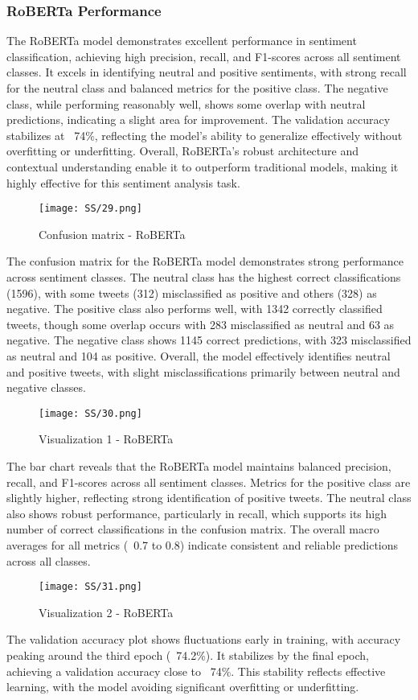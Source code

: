 \documentclass[journal]{IEEEtran}
\begin{document}
\subsubsection*{\textbf{RoBERTa Performance}}
The RoBERTa model demonstrates excellent performance in sentiment classification, achieving high precision, recall, and F1-scores across all sentiment classes. It excels in identifying neutral and positive sentiments, with strong recall for the neutral class and balanced metrics for the positive class. The negative class, while performing reasonably well, shows some overlap with neutral predictions, indicating a slight area for improvement. The validation accuracy stabilizes at ~74\%, reflecting the model's ability to generalize effectively without overfitting or underfitting. Overall, RoBERTa's robust architecture and contextual understanding enable it to outperform traditional models, making it highly effective for this sentiment analysis task.
\begin{figure}[H]
\centering
\texttt{[image: SS/29.png]}
\caption{Confusion matrix - RoBERTa}
\end{figure}
The confusion matrix for the RoBERTa model demonstrates strong performance across sentiment classes. The neutral class has the highest correct classifications (1596), with some tweets (312) misclassified as positive and others (328) as negative. The positive class also performs well, with 1342 correctly classified tweets, though some overlap occurs with 283 misclassified as neutral and 63 as negative. The negative class shows 1145 correct predictions, with 323 misclassified as neutral and 104 as positive. Overall, the model effectively identifies neutral and positive tweets, with slight misclassifications primarily between neutral and negative classes.
\begin{figure}[H]
\centering
\texttt{[image: SS/30.png]}
\caption{Visualization 1 - RoBERTa}
\end{figure}

The bar chart reveals that the RoBERTa model maintains balanced precision, recall, and F1-scores across all sentiment classes. Metrics for the positive class are slightly higher, reflecting strong identification of positive tweets. The neutral class also shows robust performance, particularly in recall, which supports its high number of correct classifications in the confusion matrix. The overall macro averages for all metrics (~0.7 to 0.8) indicate consistent and reliable predictions across all classes.
\begin{figure}[H]
\centering
\texttt{[image: SS/31.png]}
\caption{Visualization 2 - RoBERTa}
\end{figure}
The validation accuracy plot shows fluctuations early in training, with accuracy peaking around the third epoch (~74.2\%). It stabilizes by the final epoch, achieving a validation accuracy close to ~74\%. This stability reflects effective learning, with the model avoiding significant overfitting or underfitting.
\end{document}
